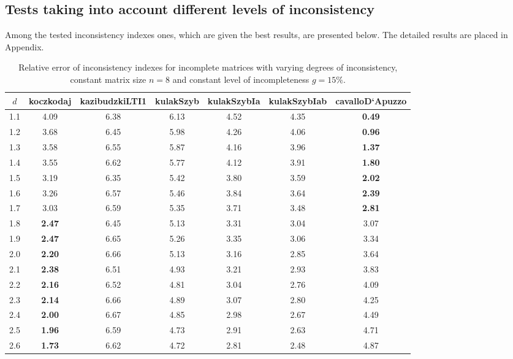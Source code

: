 \subsection{Tests taking into account different levels of inconsistency}
Among the tested inconsistency indexes ones, which are given the best results, are presented below. The detailed results are placed in Appendix.
\begin{table}[h]
\begin{center}
\caption{Relative error of inconsistency indexes for incomplete matrices with varying degrees of inconsistency, constant matrix size $n=8$ and constant level of incompleteness $g=15\%$.}
\label{tab:results1}
\begin{tabular}{|c||c|c|c|c|c|c|}
\hline $d$ & koczkodaj & kazibudzkiLTI1 & kulakSzyb & kulakSzybIa & kulakSzybIab & cavalloD`Apuzzo  \\ \hline \hline
1.1 & 4.09 & 6.38 & 6.13 & 4.52 & 4.35 & \textbf{0.49} \\ \hline
1.2 & 3.68 & 6.45 & 5.98 & 4.26 & 4.06 & \textbf{0.96} \\ \hline
1.3 & 3.58 & 6.55 & 5.87 & 4.16 & 3.96 & \textbf{1.37} \\ \hline
1.4 & 3.55 & 6.62 & 5.77 & 4.12 & 3.91 & \textbf{1.80} \\ \hline
1.5 & 3.19 & 6.35 & 5.42 & 3.80 & 3.59 & \textbf{2.02} \\ \hline
1.6 & 3.26 & 6.57 & 5.46 & 3.84 & 3.64 & \textbf{2.39} \\ \hline
1.7 & 3.03 & 6.59 & 5.35 & 3.71 & 3.48 & \textbf{2.81} \\ \hline
1.8 & \textbf{2.47} & 6.45 & 5.13 & 3.31 & 3.04 & 3.07 \\ \hline
1.9 & \textbf{2.47} & 6.65 & 5.26 & 3.35 & 3.06 & 3.34 \\ \hline
2.0 & \textbf{2.20} & 6.66 & 5.13 & 3.16 & 2.85 & 3.64 \\ \hline
2.1 & \textbf{2.38} & 6.51 & 4.93 & 3.21 & 2.93 & 3.83 \\ \hline
2.2 & \textbf{2.16} & 6.52 & 4.81 & 3.04 & 2.76 & 4.09 \\ \hline
2.3 & \textbf{2.14} & 6.66 & 4.89 & 3.07 & 2.80 & 4.25 \\ \hline
2.4 & \textbf{2.00} & 6.67 & 4.85 & 2.98 & 2.67 & 4.49 \\ \hline
2.5 & \textbf{1.96} & 6.59 & 4.73 & 2.91 & 2.63 & 4.71 \\ \hline
2.6 & \textbf{1.73} & 6.62 & 4.72 & 2.81 & 2.48 & 4.87 \\ \hline

\end{tabular}
\end{center}
\end{table}
